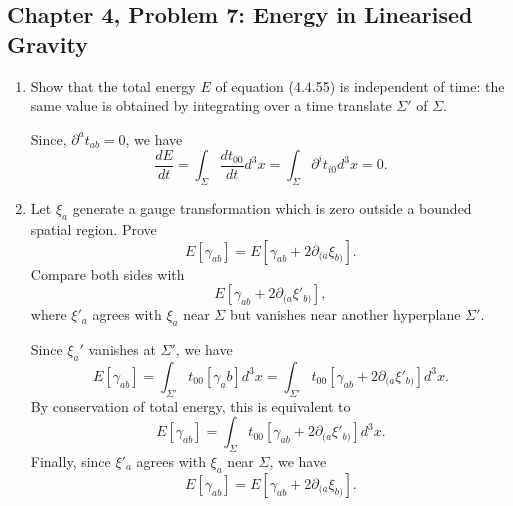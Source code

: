 \subsection{Chapter 4, Problem 7: Energy in Linearised Gravity}

\begin{enumerate}[label=\alph*)]
    \item Show that the total energy $E$ of equation (4.4.55) is independent of
    time: the same value is obtained by integrating over a time translate
    $\Sigma'$ of $\Sigma$.
    \begin{solution}
        Since, $\partial^a t_{ab} =0$, we have
        \begin{equation}
            \frac{dE}{dt} = \int_\Sigma \frac{dt_{00}}{dt}d^3x =  \int_\Sigma\partial^it_{i0}d^3x = 0.
        \end{equation}
    \end{solution}

    \item Let $\xi_a$ generate a gauge transformation which is zero outside a
    bounded spatial region. Prove
    \begin{equation}
        E[\gamma_{ab}]
        =E[\gamma_{ab}+2\partial_{(a}\xi_{b)}].
    \end{equation}
    Compare both sides with
    \begin{equation}
        E[\gamma_{ab}+2\partial_{(a}\xi'_{b)}],
    \end{equation}
    where $\xi'_a$ agrees with $\xi_a$ near $\Sigma$ but vanishes near another
    hyperplane $\Sigma'$.
    \begin{solution}
        Since $\xi_a'$ vanishes at $\Sigma'$, we have
        \begin{equation}
            E[\gamma_{ab}] = \int_{\Sigma'} t_{00}[\gamma_ab]d^3x = \int_{\Sigma'} t_{00}[\gamma_{ab}+2\partial_{(a}\xi'_{b)}]d^3x.
        \end{equation}
        By conservation of total energy, this is equivalent to
        \begin{equation}
            E[\gamma_{ab}] = \int_\Sigma t_{00}[\gamma_{ab}+2\partial_{(a}\xi'_{b)}]d^3x.
        \end{equation}
        Finally, since $\xi'_a$ agrees with $\xi_a$ near $\Sigma$, we have
        \begin{equation}
             E[\gamma_{ab}]
        =E[\gamma_{ab}+2\partial_{(a}\xi_{b)}].
        \end{equation}
    \end{solution}
\end{enumerate}

